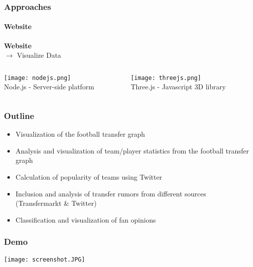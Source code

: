 \documentclass{beamer}
\begin{document}
	\begin{frame}
    \frametitle{Approaches}
		\framesubtitle{Website}
		\textbf{Website} \\
		$\rightarrow$ Visualize Data
    \begin{columns}[T] %
     \begin{column}[T]{5cm} %
			\begin{center}
     \texttt{[image: nodejs.png]}\\
			Node.js - Server-side platform
			\end{center}
     \end{column}
     \begin{column}[T]{5cm} %
		\begin{center}
		 \texttt{[image: threejs.png]} \\
			Three.js - Javascript 3D library
			\end{center}
     \end{column}
     \end{columns}
  \end{frame}
	
	\begin{frame}
    \frametitle{Outline}
		\begin{itemize}
      \item Visualization of the football transfer graph \checkmark
			\item Analysis and visualization of team/player statistics from the football transfer graph 
			\item Calculation of popularity of teams using Twitter 
			\item Inclusion and analysis of transfer rumors from different sources (Transfermarkt \& Twitter) \checkmark
			\item Classification and visualization of fan opinions \checkmark
		\end{itemize}
  \end{frame}
	
	\begin{frame}
    \frametitle{Demo}
		\begin{center}
      \texttt{[image: screenshot.JPG]}\\
			\end{center}
  \end{frame}
	
\end{document}
